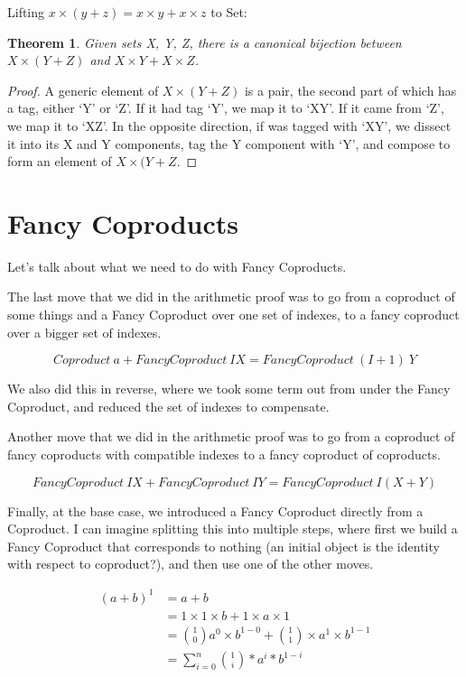 \documentclass{proc-l}
\newtheorem{theorem}{Theorem}[section]
\theoremstyle{definition}
\theoremstyle{remark}
\numberwithin{equation}{section}
\begin{document}
Lifting \(x \times (y + z) = x \times y + x \times z\) to Set:

\begin{theorem}
Given sets X, Y, Z, there is a canonical bijection between \(X \times (Y + Z)\) and \(X \times Y + X \times Z\).
\end{theorem}

\begin{proof}
A generic element of \(X \times (Y + Z)\) is a pair, the second part of which has a tag, either `Y' or `Z'. If it had tag `Y', we map it to `XY'. If it came from `Z', we map it to `XZ'. In the opposite direction, if was tagged with `XY', we dissect it into its X and Y components, tag the Y component with `Y', and compose to form an element of \(X \times (Y + Z\). 
\end{proof}

\section{Fancy Coproducts}

Let's talk about what we need to do with Fancy Coproducts.

The last move that we did in the arithmetic proof was
to go from a coproduct of some things and a Fancy Coproduct over one set of indexes, to a fancy coproduct over a bigger set of indexes.

\[
Coproduct~a + FancyCoproduct~I X = FancyCoproduct~(I+1)~Y
\]

We also did this in reverse, where we took some term out from under the Fancy Coproduct, and reduced the set of indexes to compensate.

Another move that we did in the arithmetic proof was
to go from a coproduct of fancy coproducts with compatible indexes to a fancy coproduct of coproducts.

\[
FancyCoproduct~I X + FancyCoproduct~I Y = FancyCoproduct~I (X + Y)
\]


Finally, at the base case, we introduced a Fancy Coproduct directly from a Coproduct. I can imagine splitting this into multiple steps,
where first we build a Fancy Coproduct that corresponds to nothing (an initial object is the identity with respect to coproduct?), and then use one of the other moves.





\begin{align*}
(a + b)^1 & = a + b \\ %
& = 1 \times 1 \times b + 1 \times a \times 1 \\ %
& = {1 \choose 0} a^0 \times b^{1-0} + {1 \choose 1} \times a^1 \times b^{1-1} \\ %
& = \sum_{i=0}^n {1 \choose i} * a^i * b^{1-i} %
\end{align*}
\end{document}
